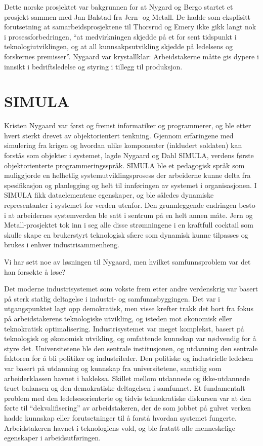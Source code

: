 \documentclass[../../main.tex]{subfiles}
\begin{document}
Dette norske prosjektet var bakgrunnen for at Nygard og Bergo startet et prosjekt sammen med Jan Balstad fra Jern- og Metall. De hadde som eksplisitt forutsetning at samarbeidsprosjektene til Thorsrud og Emery ikke gikk langt nok i prosessforbedringen, ``at medvirkningen skjedde på et for sent tidspunkt i teknologiutviklingen, og at all kunnsakpsutvikling skjedde på ledelsens og forskernes premisser''. Nygaard var krystallklar: Arbeidstakerne måtte gis dypere i innsikt i bedriftsledelse og styring i tillegg til produksjon.

\section{SIMULA}

Kristen Nygaard var først og fremst informatiker og programmerer, og ble etter hvert sterkt drevet av objektorientert tenkning. Gjennom erfaringene med simulering fra krigen og hvordan ulike komponenter (inkludert soldaten) kan forstås som objekter i systemet, lagde Nygaard og Dahl SIMULA, verdens første objektorienterte programmeringsspråk. SIMULA ble et pedagogisk språk som muliggjorde en helhetlig systemutviklingsprosess der arbeiderne kunne delta fra spesifikasjon og planlegging og helt til innføringen av systemet i organisasjonen. I SIMULA fikk dataelementene egenskaper, og ble således dynamiske representanter i systemet for verden utenfor. Den grunnleggende endringen besto i at arbeidernes systemverden ble satt i sentrum på en helt annen måte. Jern og Metall-prosjektet tok inn i seg alle disse strømningene i en kraftfull cocktail som skulle skape en brukerstyrt teknologisk sfære som dynamisk kunne tilpasses og brukes i enhver industrisammenheng. 

Vi har sett noe av løsningen til Nygaard, men hvilket samfunnsproblem var det han forsøkte å løse? 

Det moderne industrisystemet som vokste frem etter andre verdenskrig var basert på sterk statlig deltagelse i industri- og samfunnsbyggingen. Det var i utgangspunktet lagt opp demokratisk, men visse krefter trakk det bort fra fokus på arbeidstakerens teknologiske utvikling, og isteden mot økonomisk eller teknokratisk optimalisering. Industrisystemet var meget komplekst, basert på teknologisk og økonomisk utvikling, og omfattende kunnskap var nødvendig for å styre det. Universitetene ble den sentrale institusjonen, og utdanning den sentrale faktoren for å bli politiker og industrileder. Den politiske og industrielle ledelsen var basert på utdanning og kunnskap fra universitetene, samtidig som arbeiderklassen havnet i bakleksa. Skillet mellom utdannede og ikke-utdannede truet balansen og den demokratiske deltagelsen i samfunnet. Et fundamentalt problem med den ledelsesorienterte og tidvis teknokratiske diskursen var at den førte til ``dekvalifisering'' av arbeidstakeren, der de som jobbet på gulvet verken hadde kunnskap eller forutsetninger til å forstå hvordan systemet fungerte. Arbeidstakeren havnet i teknologiens vold, og ble fratatt alle menneskelige egenskaper i arbeidsutføringen.
\end{document}

